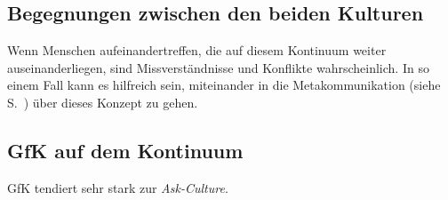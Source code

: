 \subsection{Begegnungen zwischen den beiden Kulturen}

Wenn Menschen aufeinandertreffen, die auf diesem Kontinuum weiter auseinanderliegen, sind Missverständnisse und Konflikte wahrscheinlich. In so einem Fall kann es hilfreich sein, miteinander in die Metakommunikation (siehe S.~\pageref{metakommunikation}) über dieses Konzept zu gehen.


\subsection{GfK auf dem Kontinuum}

GfK tendiert sehr stark zur \emph{Ask-Culture}.
